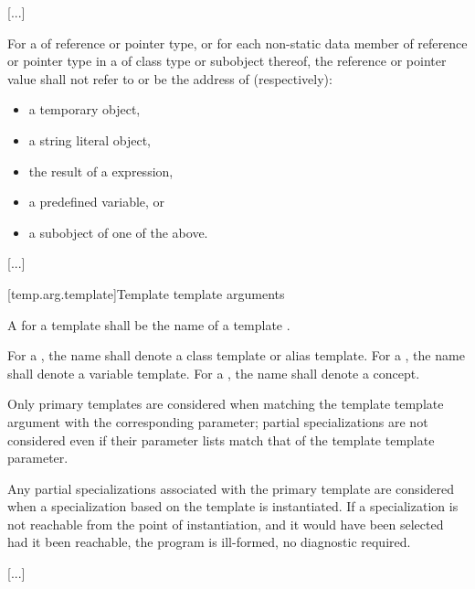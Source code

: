 \documentclass{wg21}
\begin{document}
\textcolor{noteclr}{[...]}

\pnum
For a  of reference or pointer type,
or for each non-static data member of reference or pointer type
in a  of class type or subobject thereof,
the reference or pointer value shall not refer to
or be the address of (respectively):
\begin{itemize}
    \item a temporary object,
    \item a string literal object,
    \item the result of a  expression,
    \item a predefined  variable, or
    \item a subobject of one of the above.
\end{itemize}

\textcolor{noteclr}{[...]}

[temp.arg.template]{Template template arguments}

\pnum A
for a template
shall be the name of a  template .

\begin{addedblock}
For a , the name shall denote a class template or alias template. For a , the name shall denote a variable template. For a , the name shall denote a concept.
\end{addedblock}

Only primary templates are considered when matching the template template
argument with the corresponding parameter; partial specializations are not
considered even if their parameter lists match that of the template template
parameter.

\pnum
Any partial specializations  associated with the
primary template are considered when a
specialization based on the template 
is instantiated.
If a specialization is not reachable from the point of instantiation,
and it would have been selected had it been reachable, the program is ill-formed,
no diagnostic required.
\begin{example} \textcolor{noteclr}{[...]} \end{example}
\end{document}

